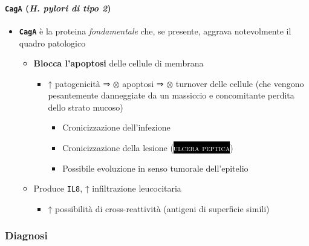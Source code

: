 \documentclass[italian,]{article}
\providecommand{\tightlist}{%
  \setlength{\itemsep}{0pt}\setlength{\parskip}{0pt}}
\newcommand{\pat}[1]{\colorbox{black}{\textcolor{white}{\textsc{#1}}}}
\newcommand{\ini}[0]{ $\otimes$ }                                       %
\begin{document}
\hypertarget{caga-h.-pylori-di-tipo-2}{%
\paragraph{\texorpdfstring{\texttt{CagA} (\emph{H. pylori di tipo
2})}{CagA (H. pylori di tipo 2)}}\label{caga-h.-pylori-di-tipo-2}}

\begin{itemize}
\tightlist
\item
  \textbf{\texttt{CagA}} è la proteina \emph{fondamentale} che, se
  presente, aggrava notevolmente il quadro patologico

  \begin{itemize}
  \tightlist
  \item
    \textbf{Blocca l'apoptosi} delle cellule di membrana

    \begin{itemize}
    \tightlist
    \item
      ↑ patogenicità ⇒ \ini apoptosi ⇒ \ini turnover delle cellule (che
      vengono pesantemente danneggiate da un massiccio e concomitante
      perdita dello strato mucoso)

      \begin{itemize}
      \tightlist
      \item
        Cronicizzazione dell'infezione
      \item
        Cronicizzazione della lesione (\pat{ulcera peptica})
      \item
        Possibile evoluzione in senso tumorale dell'epitelio
      \end{itemize}
    \end{itemize}
  \item
    Produce \texttt{IL8}, ↑ infiltrazione leucocitaria

    \begin{itemize}
    \tightlist
    \item
      ↑ possibilità di cross-reattività (antigeni di superficie simili)
    \end{itemize}
  \end{itemize}
\end{itemize}

\hypertarget{diagnosi-2}{%
\subsubsection{Diagnosi}\label{diagnosi-2}}
\end{document}

